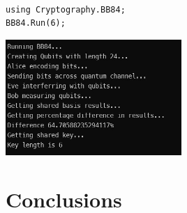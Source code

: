 \documentclass{article}
\begin{document}
\begin{lstlisting}[language={[Sharp]C}, caption={C\# Driver code sets the key length to 6}, label={Script}]

using Cryptography.BB84;
BB84.Run(6);

\end{lstlisting}

\includegraphics[width=0.5\textwidth]{BB84Output.jpg}

\section{Conclusions}

\printbibliography
\end{document}
